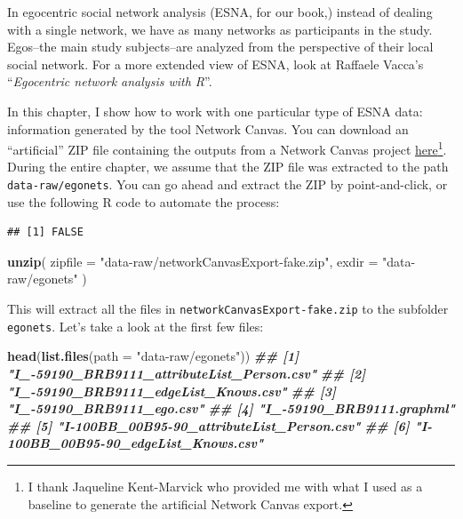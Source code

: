 \documentclass[
]{book}
\newenvironment{Shaded}{\begin{snugshade}}{\end{snugshade}}
\newcommand{\AttributeTok}[1]{\textcolor[rgb]{0.13,0.29,0.53}{#1}}
\newcommand{\DocumentationTok}[1]{\textcolor[rgb]{0.56,0.35,0.01}{\textbf{\textit{#1}}}}
\newcommand{\FunctionTok}[1]{\textcolor[rgb]{0.13,0.29,0.53}{\textbf{#1}}}
\newcommand{\NormalTok}[1]{#1}
\newcommand{\StringTok}[1]{\textcolor[rgb]{0.31,0.60,0.02}{#1}}
\begin{document}
In egocentric social network analysis (ESNA, for our book,) instead of dealing with a single network, we have as many networks as participants in the study. Egos--the main study subjects--are analyzed from the perspective of their local social network. For a more extended view of ESNA, look at Raffaele Vacca's ``\emph{Egocentric network analysis with R}''.

In this chapter, I show how to work with one particular type of ESNA data: information generated by the tool Network Canvas. You can download an ``artificial'' ZIP file containing the outputs from a Network Canvas project \href{data-raw/networkCanvasExport-fake.zip}{here}\footnote{I thank Jaqueline Kent-Marvick who provided me with what I used as a baseline to generate the artificial Network Canvas export.}. During the entire chapter, we assume that the ZIP file was extracted to the path \texttt{data-raw/egonets}. You can go ahead and extract the ZIP by point-and-click, or use the following R code to automate the process:

\begin{verbatim}
## [1] FALSE
\end{verbatim}

\begin{Shaded}
\begin{Highlighting}[]
\FunctionTok{unzip}\NormalTok{(}
  \AttributeTok{zipfile =} \StringTok{"data{-}raw/networkCanvasExport{-}fake.zip"}\NormalTok{,}
  \AttributeTok{exdir   =} \StringTok{"data{-}raw/egonets"}
\NormalTok{  )}
\end{Highlighting}
\end{Shaded}

This will extract all the files in \texttt{networkCanvasExport-fake.zip} to the subfolder \texttt{egonets}. Let's take a look at the first few files:

\begin{Shaded}
\begin{Highlighting}[]
\FunctionTok{head}\NormalTok{(}\FunctionTok{list.files}\NormalTok{(}\AttributeTok{path =} \StringTok{"data{-}raw/egonets"}\NormalTok{))}
\DocumentationTok{\#\# [1] "I\_{-}59190\_BRB9111\_attributeList\_Person.csv"}
\DocumentationTok{\#\# [2] "I\_{-}59190\_BRB9111\_edgeList\_Knows.csv"      }
\DocumentationTok{\#\# [3] "I\_{-}59190\_BRB9111\_ego.csv"                 }
\DocumentationTok{\#\# [4] "I\_{-}59190\_BRB9111.graphml"                 }
\DocumentationTok{\#\# [5] "I{-}100BB\_00B95{-}90\_attributeList\_Person.csv"}
\DocumentationTok{\#\# [6] "I{-}100BB\_00B95{-}90\_edgeList\_Knows.csv"}
\end{Highlighting}
\end{Shaded}
\end{document}
